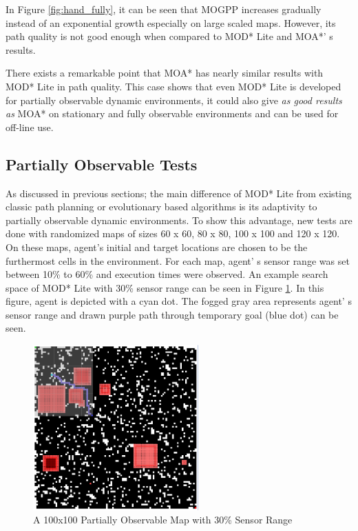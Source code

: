 \documentclass[10pt,journal]{IEEEtran}
\begin{document}
In Figure \ref{fig:hand_fully}, it can be seen that MOGPP increases gradually instead of an exponential growth especially on large scaled maps. However, its path quality is not good enough when compared to MOD* Lite and MOA*' s results.

There exists a remarkable point that MOA* has nearly similar results with MOD* Lite in path quality. This case shows that even MOD* Lite is developed for partially observable dynamic environments, it could also give \textit{as good results as} MOA* on stationary and fully observable environments and can be used for off-line use.

\subsection{Partially Observable Tests}

As discussed in previous sections; the main difference of MOD* Lite from existing classic path planning or evolutionary based algorithms is its adaptivity to partially observable dynamic environments. To show this advantage, new tests are done with randomized maps of sizes 60 x 60, 80 x 80, 100 x 100 and 120 x 120. On these maps, agent's initial and target locations are chosen to be the furthermost cells in the environment. For each map, agent' s sensor range was set between 10\% to 60\% and execution times were observed. An example search space of MOD* Lite with 30\% sensor range can be seen in Figure \ref{fig:initialSearch}. In this figure, agent is depicted with a cyan dot. The fogged gray area represents agent' s sensor range and drawn purple path through temporary goal (blue dot) can be seen.

\begin{figure}
\centering
\includegraphics[width=2.5in, angle=270]{experimental/initialSearch}
\caption{A 100x100 Partially Observable Map with 30\% Sensor Range}
\label{fig:initialSearch}
\end{figure}
\end{document}
